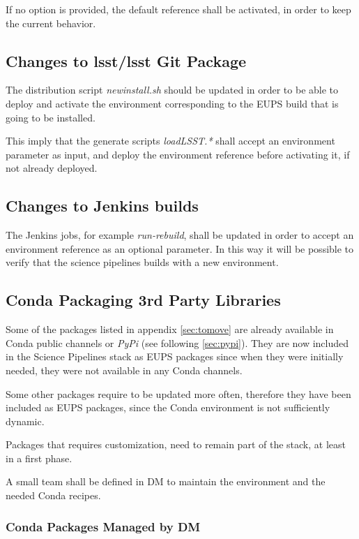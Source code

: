 If no option is provided, the default reference shall be activated, in order to keep the current behavior.


\subsection{Changes to lsst/lsst Git Package} \label{sec:newinstall}

The distribution script \textit{newinstall.sh} should be updated in order to be able to deploy and activate the environment corresponding to the EUPS build that is going to be installed.

This imply that the generate scripts \textit{loadLSST.*} shall accept an environment parameter as input, and deploy the environment reference before activating it, if not already deployed.


\subsection{Changes to Jenkins builds} \label{sec:cibuilds}

The Jenkins jobs, for example \textit{run-rebuild}, shall be updated in order to accept an environment reference as an optional parameter.
In this way it will be possible to verify that the science pipelines builds with a new environment.


\subsection{Conda Packaging 3rd Party Libraries} \label{sec:3rdpkgs}

Some of the packages listed in appendix \ref{sec:tomove} are already available in Conda public channels or \textit{PyPi} (see following \ref{sec:pypi}).
They are now included in the Science Pipelines stack as EUPS packages since when they were initially needed, they were not available in any Conda channels.

Some other packages require to be updated more often, therefore they have been included as EUPS packages, since the Conda environment is not sufficiently dynamic.

Packages that requires customization, need to remain part of the stack, at least in a first phase.

A small team shall be defined in DM to maintain the environment and the needed Conda recipes.


\subsubsection{Conda Packages Managed by DM} \label{sec:3rddmpkgs}

